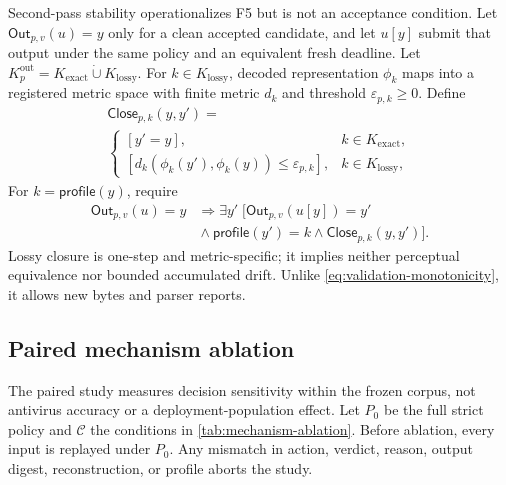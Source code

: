 Second-pass stability operationalizes F5 but is not an acceptance condition.
Let \(\mathsf{Out}_{p,v}(u)=y\) only for a clean accepted candidate, and let
\(u[y]\) submit that output under the same policy and an equivalent fresh
deadline. Let \(K_p^{\mathrm{out}}=K_{\mathrm{exact}}\mathbin{\dot\cup}
K_{\mathrm{lossy}}\). For \(k\in K_{\mathrm{lossy}}\), decoded
representation \(\phi_k\) maps into a registered metric space with finite
metric \(d_k\) and threshold \(\varepsilon_{p,k}\ge0\). Define
\begin{equation}
 \begin{gathered}
 \mathsf{Close}_{p,k}(y,y')=\\[-0.25ex]
 \begin{cases}
  [y'=y],&k\in K_{\mathrm{exact}},\\
  [d_k(\phi_k(y'),\phi_k(y))\le\varepsilon_{p,k}],
    &k\in K_{\mathrm{lossy}},
 \end{cases}
 \end{gathered}
 \label{eq:idempotence}
\end{equation}
For \(k=\mathsf{profile}(y)\), require
\[
\begin{aligned}
 \mathsf{Out}_{p,v}(u)=y&\Longrightarrow
 \exists y'\;\bigl[\mathsf{Out}_{p,v}(u[y])=y'\\
 &{}\land\mathsf{profile}(y')=k\land
 \mathsf{Close}_{p,k}(y,y')\bigr].
\end{aligned}
\]
Lossy closure is one-step and metric-specific; it implies neither perceptual
equivalence nor bounded accumulated drift. Unlike
\cref{eq:validation-monotonicity}, it allows new bytes and parser reports.

\subsection{Paired mechanism ablation}
\label{subsec:mechanism-ablation}

The paired study measures decision sensitivity within the frozen corpus, not
antivirus accuracy or a deployment-population effect. Let \(P_0\) be the full
strict policy and \(\mathcal{C}\) the conditions in
\cref{tab:mechanism-ablation}. Before ablation, every input is replayed under
\(P_0\). Any mismatch in action, verdict, reason, output digest,
reconstruction, or profile aborts the study.

